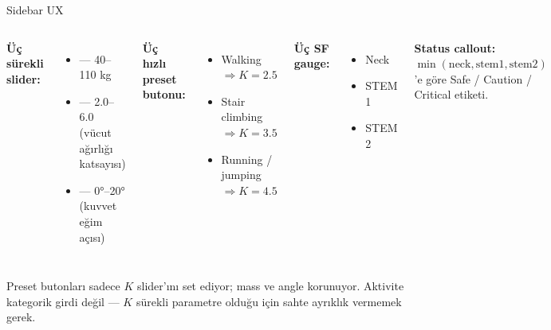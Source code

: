 \begin{frame}{Sidebar UX}
  \begin{columns}[T,onlytextwidth]
    \textbf{Üç sürekli slider:}
    \begin{itemize}\small
      \item {} --- 40--110 kg
      \item {} --- 2.0--6.0 (vücut ağırlığı katsayısı)
      \item {} --- 0°--20° (kuvvet eğim açısı)
    \end{itemize}
    \vspace{0.3cm}
    \textbf{Üç hızlı preset butonu:}
    \begin{itemize}\small
      \item Walking \(\Rightarrow K = 2.5\)
      \item Stair climbing \(\Rightarrow K = 3.5\)
      \item Running / jumping \(\Rightarrow K = 4.5\)
    \end{itemize}
    \textbf{Üç SF gauge:}
    \begin{itemize}\small
      \item Neck
      \item STEM 1
      \item STEM 2
    \end{itemize}
    \vspace{0.3cm}
    \textbf{Status callout:}
    \(\min(\text{neck}, \text{stem1}, \text{stem2})\)'e göre Safe /
    Caution / Critical etiketi.
  \end{columns}

  \vspace{0.4cm}
  \footnotesize
  Preset butonları sadece \(K\) slider'ını set ediyor; mass ve angle
  korunuyor. Aktivite kategorik girdi değil --- \(K\) sürekli
  parametre olduğu için sahte ayrıklık vermemek gerek.
\end{frame}

